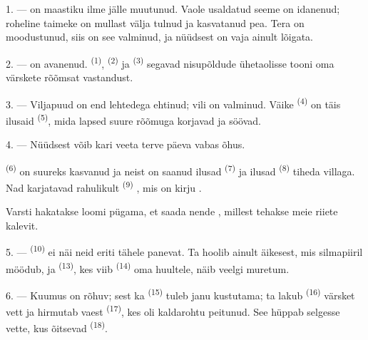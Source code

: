 \VUsaut{5.0mm}
\VUsaut{3.0mm}
\VUsaut{3.0mm}
\VUsaut{4.0mm}
\VUsaut{3.0mm}

1. ---  on maastiku ilme jälle muutunud. Vaole usaldatud seeme on
idanenud; roheline taimeke on mullast välja tulnud ja kasvatanud pea. Tera on
moodustunud, siis on see valminud, ja nüüdsest on vaja ainult lõigata.

2. ---  on avanenud.  \textsuperscript{(1)},
 \textsuperscript{(2)} ja  \textsuperscript{(3)}
segavad nisupõldude ühetaolisse tooni oma värskete  rõõmsat
vastandust.

3. --- Viljapuud on end lehtedega ehtinud; vili on valminud. Väike 
\textsuperscript{(4)} on täis ilusaid  \textsuperscript{(5)}, mida lapsed
suure rõõmuga korjavad ja söövad.

4. --- Nüüdsest võib kari veeta terve päeva vabas õhus.

 \textsuperscript{(6)} on suureks kasvanud ja neist on saanud ilusad
 \textsuperscript{(7)} ja ilusad  \textsuperscript{(8)} tiheda
villaga. Nad karjatavad rahulikult  \textsuperscript{(9)}
, mis on kirju .

Varsti hakatakse  loomi pügama, et saada nende , millest
tehakse meie riiete kalevit.

\VUsaut{5.0mm}
\VUsaut{3.4mm}

5. ---  \textsuperscript{(10)} ei näi neid eriti tähele panevat. Ta
hoolib ainult äikesest, mis silmapiiril möödub, ja 
\textsuperscript{(13)}, kes viib  \textsuperscript{(14)} oma huultele,
näib veelgi muretum.

6. --- Kuumus on rõhuv; sest ka  \textsuperscript{(15)} tuleb janu
kustutama; ta lakub  \textsuperscript{(16)} värsket vett ja hirmutab vaest
 \textsuperscript{(17)}, kes oli kaldarohtu peitunud. See hüppab selgesse
vette, kus õitsevad  \textsuperscript{(18)}.

